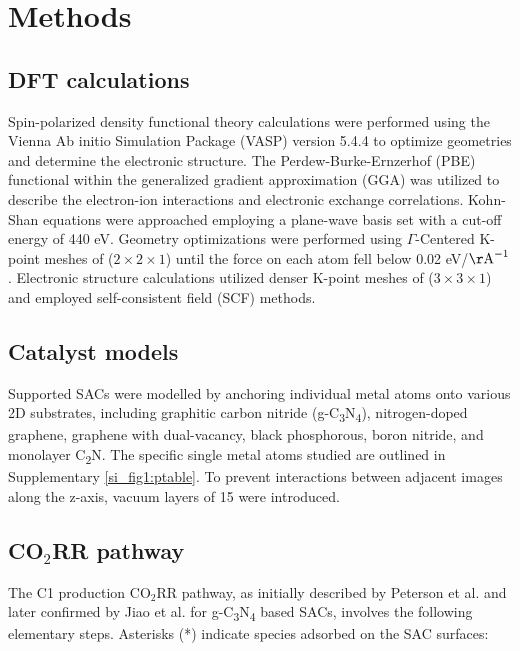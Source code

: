

\section{Methods}


\subsection{DFT calculations}
Spin-polarized density functional theory calculations were performed using the Vienna Ab initio Simulation Package (VASP) version 5.4.4 \cite{kresse1996efficient, kresse1996efficiency, kresse1993ab} to optimize geometries and determine the electronic structure.
The Perdew-Burke-Ernzerhof (PBE) functional \cite{kresse1996efficient} within the generalized gradient approximation (GGA) \cite{perdew1996generalized} was utilized to describe the electron-ion interactions and electronic exchange correlations.
Kohn-Shan equations were approached employing a plane-wave basis set with a cut-off energy of 440 eV.
Geometry optimizations were performed using $\Gamma$-Centered K-point meshes of ($2\times2\times1$) until the force on each atom fell below 0.02 eV/\(\mathrm{\AA}^{-1}\).
Electronic structure calculations utilized denser K-point meshes of ($3\times3\times1$) and employed self-consistent field (SCF) methods.


\subsection{Catalyst models}
Supported SACs were modelled by anchoring individual metal atoms onto various 2D substrates, including graphitic carbon nitride (g-C\textsubscript{3}N\textsubscript{4}), nitrogen-doped graphene, graphene with dual-vacancy, black phosphorous, boron nitride, and monolayer C\textsubscript{2}N.
The specific single metal atoms studied are outlined in Supplementary \cref{si_fig1:ptable}.
To prevent interactions between adjacent images along the z-axis, vacuum layers of 15 \text{\AA} were introduced.


\subsection{CO$_2$RR pathway}
The C1 production CO$_2$RR pathway, as initially described by Peterson et al. \cite{peterson2010copper} and later confirmed by Jiao et al. \cite{jiao2017molecular} for g-C\textsubscript{3}N\textsubscript{4} based SACs, involves the following elementary steps.
Asterisks (*) indicate species adsorbed on the SAC surfaces:


